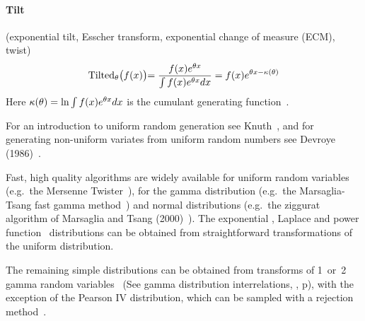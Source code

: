 \paragraph*{Tilt} (exponential tilt, Esscher transform, exponential change of measure (ECM), twist)~\cite{Esscher1932,Siegmund1976} 
\[
\operatorname{Tilted}_\theta\bigr( f(x) \bigl) =  \frac{ f(x) e^{\theta x} }{\int f(x) e^{\theta x} dx }
= f(x) e^{\theta x - \kappa(\theta) }  
\notag
\]
Here $\kappa(\theta)= \ln \int  f(x) e^{\theta x} dx$ is the cumulant generating function~\pageref{CGF}.




\label{sec:random}
For an introduction to uniform random generation see Knuth~\cite{Knuth1997}, and for generating non-uniform variates from uniform random numbers see  Devroye (1986)~\cite{Devroye1986}. 

Fast, high quality algorithms are widely available for uniform random variables (e.g.\ the Mersenne Twister~\cite{Matsumoto1998}), for the gamma distribution (e.g.\ the Marsaglia-Tsang fast gamma method~\cite{Marsaglia2001}) and normal distributions (e.g.\ the ziggurat algorithm of Marsaglia and Tsang (2000)~\cite{Marsaglia2000}). The exponential , Laplace  and power function~ distributions can be obtained from straightforward transformations of the uniform distribution.

The remaining  simple distributions can be obtained from transforms of 1~or~2 gamma random variables~\cite{Devroye1986} (See gamma distribution interrelations, , p\pageref{gammatransforms}), with the exception of the Pearson IV distribution, which can be sampled with a rejection method~\cite{Devroye1986,Heinrich2004}.


